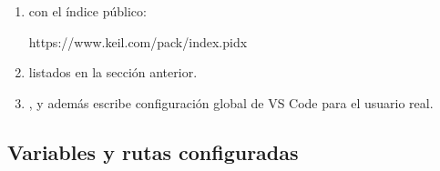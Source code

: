 \documentclass[letterpaper,10pt,english]{sphinxmanual}
\begin{document}
\begin{enumerate}
\sphinxAtStartPar
y publica la variable:

\begin{sphinxVerbatim}[commandchars=\\\{\}]
AC6\PYGZus{}TOOLCHAIN\PYGZus{}6\PYGZus{}24\PYGZus{}0
\end{sphinxVerbatim}

\item {} 
\sphinxAtStartPar
{} con el índice público:

\begin{sphinxVerbatim}[commandchars=\\\{\}]
https://www.keil.com/pack/index.pidx
\end{sphinxVerbatim}

\item {} 
\sphinxAtStartPar
{} listados en la sección anterior.

\item {} 
\sphinxAtStartPar
{}, y además escribe
configuración global de VS Code para el usuario real.

\end{enumerate}


\subsection{Variables y rutas configuradas}
\label{\detokenize{vscode:variables-y-rutas-configuradas}}
\end{document}
